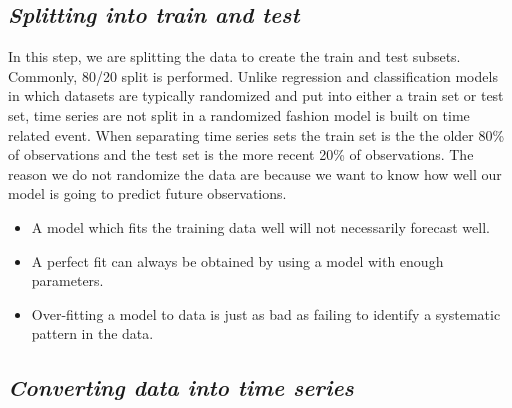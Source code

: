 \documentclass[12pt,openany]{book}
\newenvironment{Shaded}{\begin{snugshade}}{\end{snugshade}}
\newcommand{\CommentTok}[1]{\textcolor[rgb]{0.56,0.35,0.01}{\textit{#1}}}
\newcommand{\DecValTok}[1]{\textcolor[rgb]{0.00,0.00,0.81}{#1}}
\newcommand{\FloatTok}[1]{\textcolor[rgb]{0.00,0.00,0.81}{#1}}
\newcommand{\KeywordTok}[1]{\textcolor[rgb]{0.13,0.29,0.53}{\textbf{#1}}}
\newcommand{\NormalTok}[1]{#1}
\newcommand{\OperatorTok}[1]{\textcolor[rgb]{0.81,0.36,0.00}{\textbf{#1}}}
\newcommand{\StringTok}[1]{\textcolor[rgb]{0.31,0.60,0.02}{#1}}
\providecommand{\tightlist}{%
  \setlength{\itemsep}{0pt}\setlength{\parskip}{0pt}}
\begin{document}
\hypertarget{splitting-into-train-and-test}{%
\subsection{\texorpdfstring{\textbf{\emph{Splitting into train and test}}}{Splitting into train and test}}\label{splitting-into-train-and-test}}

In this step, we are splitting the data to create the train and test subsets. Commonly, 80/20 split is performed. Unlike regression and classification models in which datasets are typically randomized and put into either a train set or test set, time series are not split in a randomized fashion model is built on time related event. When separating time series sets the train set is the the older 80\% of observations and the test set is the more recent 20\% of observations. The reason we do not randomize the data are because we want to know how well our model is going to predict future observations.

\begin{itemize}
\tightlist
\item
  A model which fits the training data well will not necessarily forecast well.
\item
  A perfect fit can always be obtained by using a model with enough parameters.
\item
  Over-fitting a model to data is just as bad as failing to identify a systematic pattern in the data.
\end{itemize}

\begin{Shaded}
\end{Shaded}

\hypertarget{converting-data-into-time-series}{%
\subsection{\texorpdfstring{\textbf{\emph{Converting data into time series}}}{Converting data into time series}}\label{converting-data-into-time-series}}
\end{document}
